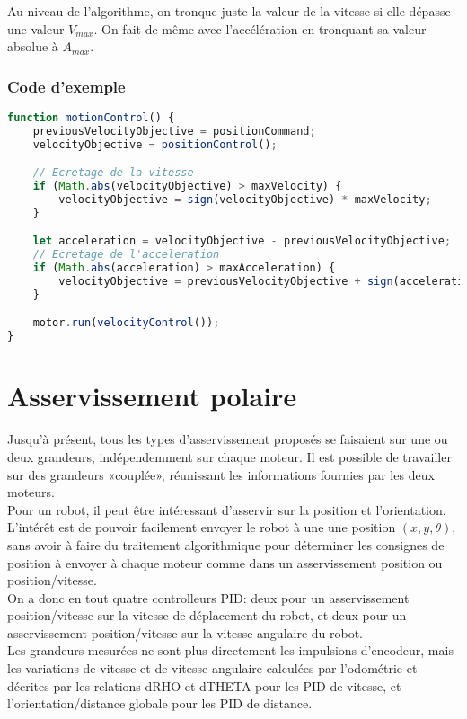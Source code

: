         \newpage

        Au niveau de l'algorithme, on tronque juste la valeur de la vitesse si elle dépasse une valeur $V_{max}$. On fait de même avec l'accélération en tronquant sa valeur absolue à $A_{max}$.
        \subsubsection{Code d'exemple}
            \begin{lstlisting}[language=JavaScript]
function motionControl() {
    previousVelocityObjective = positionCommand;
    velocityObjective = positionControl();

    // Ecretage de la vitesse
    if (Math.abs(velocityObjective) > maxVelocity) {
        velocityObjective = sign(velocityObjective) * maxVelocity;
    }

    let acceleration = velocityObjective - previousVelocityObjective;
    // Ecretage de l'acceleration
    if (Math.abs(acceleration) > maxAcceleration) {
        velocityObjective = previousVelocityObjective + sign(acceleration) * maxAcceleration;
    }

    motor.run(velocityControl());
}
            \end{lstlisting}

    \newpage
    \section{Asservissement polaire}
        Jusqu'à présent, tous les types d'asservissement proposés se faisaient sur une ou deux grandeurs, indépendemment sur chaque moteur. Il est possible de travailler sur des grandeurs «couplée», réunissant les informations fournies par les deux moteurs.\\

        Pour un robot, il peut être intéressant d'asservir sur la position et l'orientation. L'intérêt est de pouvoir facilement envoyer le robot à une une position $(x, y, \theta)$, sans avoir à faire du traitement algorithmique pour déterminer les consignes de position à envoyer à chaque moteur comme dans un asservissement position ou position/vitesse.\\
        On a donc en tout quatre controlleurs PID: deux pour un asservissement position/vitesse sur la vitesse de déplacement du robot, et deux pour un asservissement position/vitesse sur la vitesse angulaire du robot.\\
        Les grandeurs mesurées ne sont plus directement les impulsions d'encodeur, mais les variations de vitesse et de vitesse angulaire calculées par l'odométrie et décrites par les relations dRHO et dTHETA pour les PID de vitesse, et l'orientation/distance globale pour les PID de distance.

